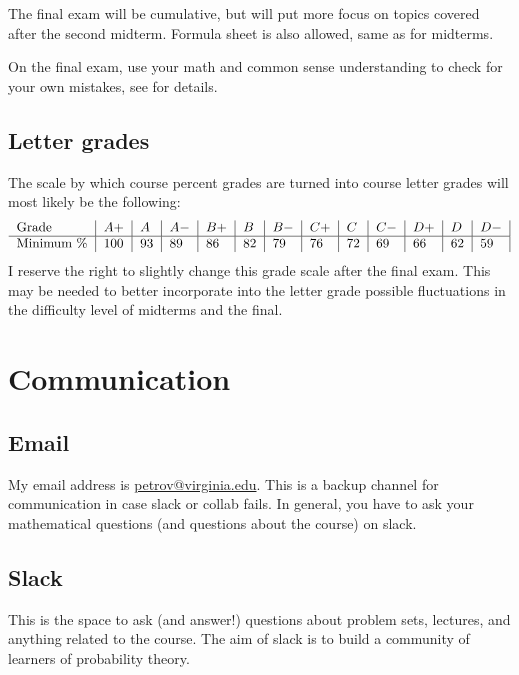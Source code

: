 \documentclass[oneside,11pt]{amsart}
\begin{document}
The final exam will be cumulative, but will put more focus 
on topics covered after the second midterm.
Formula sheet is also allowed, same as for midterms.

On the final exam, use your math and common sense understanding to check for your own mistakes,
see  for details.


\subsection*{Letter grades}

The scale by which course percent grades are turned into course letter grades
will most likely be the following:
\begin{equation*}
	\begin{tabular}{l|l|l|l|l|l|l|l|l|l|l|l|l|}
		Grade      & $ A+	$ & $A	$ & $A-	$ & $B+	$ & $B	$ & $B-	$ & $C+	$ & $C	$ & $C-	$ & $D+	$ & $D	$ & $D-$ \\
		\hline
		Minimum \% & 100     & 93   & 89    & 86    & 82    & 79    & 76    & 72    & 69    & 66    & 62    & 59
	\end{tabular}
\end{equation*}
I reserve the right to slightly change this grade scale after the
final exam.
This may be needed
to better incorporate into the letter grade
possible fluctuations in the difficulty level of 
midterms and the final.

\section{Communication}
\label{comm}

\subsection{Email}
\label{sub:email}

My email address is \href{mailto:petrov@virginia.edu}{petrov@virginia.edu}.
This is a backup channel for communication in case slack or collab fails.
In general, you have to
ask your mathematical questions (and questions about the course) on slack.

\subsection{Slack}
\label{sub:slack}

This is the space to ask (and answer!) 
questions about problem sets, 
lectures, and anything related to the course. The aim of slack is to build a community of learners
of probability theory.
\end{document}
